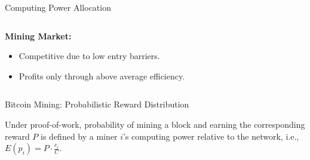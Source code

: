 \documentclass[]{beamer}
\begin{document}
\begin{frame}{Computing Power Allocation}

\begin{columns}[T]
	\begin{column}{0.45\textwidth}
		\textbf{Mining Market:} \\
		\begin{itemize}
			\item Competitive due to low entry barriers.
			\item Profits only through above average efficiency.
		\end{itemize}		
		
		
		\vspace{1 em}
		
		\vspace{1 em}
	\end{column} %
	\begin{column}{0.55\textwidth}
		\begin{center}
		\begin{tikzpicture}[scale=1.0, every node/.style ={scale=1.0}]
			
		\end{tikzpicture}
		\end{center}
	\end{column}
\end{columns}

	
\end{frame}

\begin{frame}{Bitcoin Mining: Probabilistic Reward Distribution}

Under proof-of-work, probability of mining a block and earning the corresponding reward $P$ is defined by a miner $i$'s computing power relative to the network, i.e., $E(p_{i}) = P  \cdot \frac{c_{i}}{C}$.


\vspace{1.5 em}

\end{frame}
\end{document}
